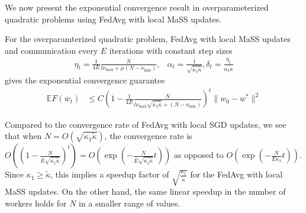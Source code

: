 We now present the exponential convergence result in overparameterized
quadratic problems using FedAvg with local MaSS updates. 
\begin{theorem}
For the overparamterized quadratic problem, FedAvg with local MaSS
updates and communication every $E$ iterations with constant step
sizes 
\begin{align*}
\eta_{t}=\frac{1}{4E}\frac{N}{l\nu_{\max}+\mu(N-\nu_{\min})}, & \alpha_{t}=\frac{1}{\sqrt{\kappa_{1}\tilde{\kappa}}},\delta_{t}=\frac{\eta_{t}}{\alpha_{t}\tilde{\kappa}}
\end{align*}
gives the exponential convergence guarantee 
\begin{align*}
\mathbb{E}F(\overline{w}_{t}) & \leq C(1-\frac{1}{4E}\frac{N}{l\nu_{\max}\sqrt{\kappa_{1}\tilde{\kappa}}+(N-\nu_{\min})})^{t}\|w_{0}-w^{\ast}\|^{2}
\end{align*}
\end{theorem}
Compared to the convergence rate of FedAvg with local SGD updates,
we see that when $N=O(\sqrt{\kappa_{1}\tilde{\kappa}})$, the convergence
rate is $O((1-\frac{N}{E\sqrt{\kappa_{1}\tilde{\kappa}}})^{t})=O(\exp(-\frac{N}{E\sqrt{\kappa_{1}\tilde{\kappa}}}t))$
as opposed to $O(\exp(-\frac{N}{E\kappa_{1}}t))$. Since $\kappa_{1}\geq\tilde{\kappa}$,
this implies a speedup factor of $\sqrt{\frac{\kappa_{1}}{\tilde{\kappa}}}$
for the FedAvg with local MaSS updates. On the other hand, the same
linear speedup in the number of workers holds for $N$ in a smaller
range of values. 